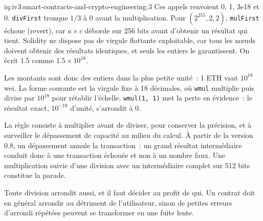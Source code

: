 \begin{solution}{iq:iv3:smart-contracts-and-crypto-engineering:3}
Ces appels renvoient 0, 1, 3e18 et 0. \texttt{divFirst} tronque $1/3$ à 0 avant la multiplication. Pour $(2^{255}, 2, 2)$, \texttt{mulFirst} échoue (revert), car $a \times c$ déborde sur 256 bits avant d'obtenir un résultat qui tient. Solidity ne dispose pas de virgule flottante exploitable, car tous les nœuds doivent obtenir des résultats identiques, et seuls les entiers le garantissent. On écrit 1.5 comme $1.5 \times 10^{18}$.

Les montants sont donc des entiers dans la plus petite unité~: 1 ETH vaut $10^{18}$ wei. La forme courante est la virgule fixe à 18 décimales, où \texttt{wmul} multiplie puis divise par $10^{18}$ pour rétablir l'échelle. \texttt{wmul(1, 1)} met la perte en évidence~: le résultat exact, $10^{-18}$ d'unité, s'arrondit à 0.

La règle consiste à multiplier avant de diviser, pour conserver la précision, et à surveiller le dépassement de capacité au milieu du calcul. À partir de la version 0.8, un dépassement annule la transaction~: un grand résultat intermédiaire conduit donc à une transaction échouée et non à un nombre faux. Une multiplication suivie d'une division avec un intermédiaire complet sur 512 bits constitue la parade.

Toute division arrondit aussi, et il faut décider au profit de qui. Un contrat doit en général arrondir au détriment de l'utilisateur, sinon de petites erreurs d'arrondi répétées peuvent se transformer en une fuite lente.

\end{solution}

